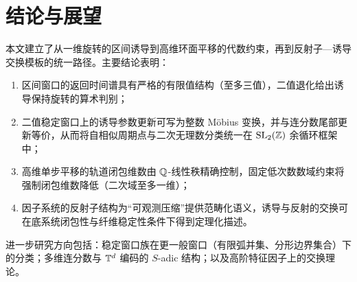 \section{结论与展望}

本文建立了从一维旋转的区间诱导到高维环面平移的代数约束，再到反射子—诱导交换模板的统一路径。主要结论表明：
\begin{enumerate}
  \item 区间窗口的返回时间谱具有严格的有限值结构（至多三值），二值退化给出诱导保持旋转的算术判别；
  \item 二值稳定窗口上的诱导参数更新可写为整数 Möbius 变换，并与连分数尾部更新等价，从而将自相似周期点与二次无理数分类统一在 $\mathrm{SL}_2(\mathbb{Z})$ 余循环框架中；
  \item 高维单步平移的轨道闭包维数由 $\mathbb{Q}$-线性秩精确控制，固定低次数数域约束将强制闭包维数降低（二次域至多一维）；
  \item 因子系统的反射子结构为“可观测压缩”提供范畴化语义，诱导与反射的交换可在底系统闭包性与纤维稳定性条件下得到定理化描述。
\end{enumerate}

进一步研究方向包括：稳定窗口族在更一般窗口（有限弧并集、分形边界集合）下的分类；多维连分数与 $\mathbb{T}^d$ 编码的 $S$-adic 结构；以及高阶特征因子上的交换理论。

